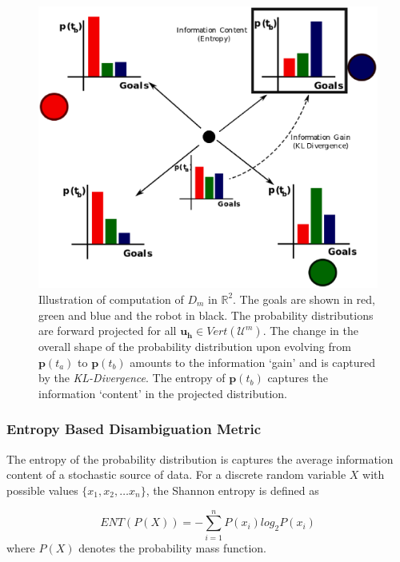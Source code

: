 \documentclass[conference]{IEEEtran}
\begin{document}
 \begin{figure}[h]
	\centering
	\includegraphics[width= 1.\hsize, height=0.3\vsize]{./figures/Disamb_Compute.eps}
	\vspace{-0.35cm}
	\caption{Illustration of computation of $D_m$ in $\mathbb{R}^2$. The goals are shown in red, green and blue and the robot in black. The probability distributions are forward projected for all $\boldsymbol{u_h} \in Vert(\mathcal{U}^m)$. The change in the overall shape of the probability distribution upon evolving from $\boldsymbol{p}(t_a)$ to $\boldsymbol{p}(t_b)$ amounts to the information `gain' and is captured by the \textit{KL-Divergence}. The entropy of $\boldsymbol{p}(t_b)$ captures the information `content' in the projected distribution.} 
	\label{fig:disamb_compute}
\end{figure}


\subsubsection{Entropy Based Disambiguation Metric}\label{sssec:ent}
The entropy of the probability distribution is captures the average information content of a stochastic source of data. For a discrete random variable $X$ with possible values $\{x_1, x_2,\dots x_n\}$, the Shannon entropy is defined as 

\begin{equation*}
ENT(P(X)) = -\sum_{i = 1}^{n} P(x_i)log_{2}P(x_i)
\end{equation*}
where $P(X)$ denotes the probability mass function.
\end{document}
